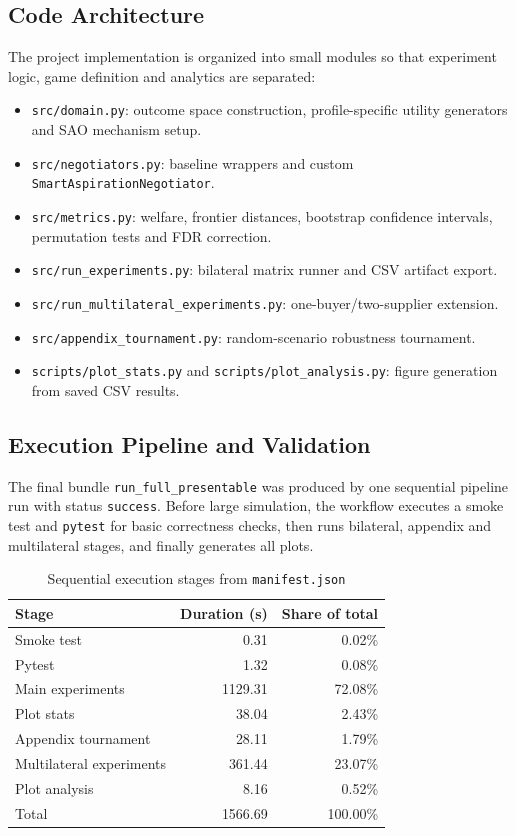 \documentclass[11pt]{article}
\begin{document}
\subsection{Code Architecture}
The project implementation is organized into small modules so that experiment logic, game definition and analytics are separated:
\begin{itemize}[leftmargin=1.5em]
    \item \texttt{src/domain.py}: outcome space construction, profile-specific utility generators and SAO mechanism setup.
    \item \texttt{src/negotiators.py}: baseline wrappers and custom \texttt{SmartAspirationNegotiator}.
    \item \texttt{src/metrics.py}: welfare, frontier distances, bootstrap confidence intervals, permutation tests and FDR correction.
    \item \texttt{src/run\_experiments.py}: bilateral matrix runner and CSV artifact export.
    \item \texttt{src/run\_multilateral\_experiments.py}: one-buyer/two-supplier extension.
    \item \texttt{src/appendix\_tournament.py}: random-scenario robustness tournament.
    \item \texttt{scripts/plot\_stats.py} and \texttt{scripts/plot\_analysis.py}: figure generation from saved CSV results.
\end{itemize}

\subsection{Execution Pipeline and Validation}
The final bundle \texttt{run\_full\_presentable} was produced by one sequential pipeline run with status \texttt{success}. Before large simulation, the workflow executes a smoke test and \texttt{pytest} for basic correctness checks, then runs bilateral, appendix and multilateral stages, and finally generates all plots.

\begin{table}[H]
\centering
\caption{Sequential execution stages from \texttt{manifest.json}}
\small
\begin{tabular}{lrr}
\toprule
Stage & Duration (s) & Share of total \\
\midrule
Smoke test & 0.31 & 0.02\% \\
Pytest & 1.32 & 0.08\% \\
Main experiments & 1129.31 & 72.08\% \\
Plot stats & 38.04 & 2.43\% \\
Appendix tournament & 28.11 & 1.79\% \\
Multilateral experiments & 361.44 & 23.07\% \\
Plot analysis & 8.16 & 0.52\% \\
\midrule
Total & 1566.69 & 100.00\% \\
\bottomrule
\end{tabular}
\end{table}
\end{document}
